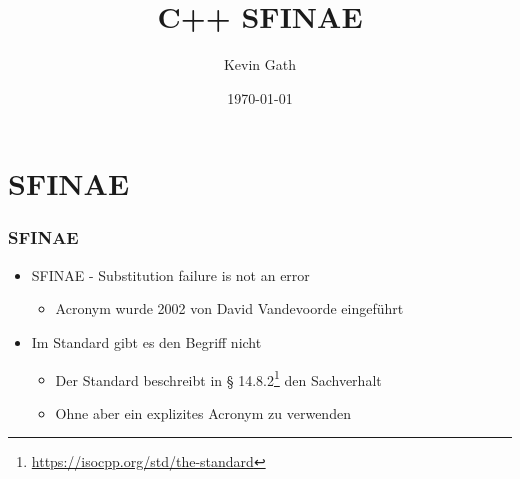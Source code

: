 \documentclass{beamer}
\title{C++ SFINAE}
\author{Kevin Gath}
\date{\today}
\begin{document}
\begin{frame}
\titlepage
\end{frame} 



\section{SFINAE} 
\begin{frame}
\frametitle{SFINAE} 
\begin{itemize}

\item SFINAE - \glqq{}Substitution failure is not an error\grqq
\begin{itemize}
\item Acronym wurde 2002 von David Vandevoorde eingeführt
\end{itemize}

\item Im Standard gibt es den Begriff nicht
\begin{itemize}
\item Der Standard beschreibt in § 14.8.2\footnote{\url{https://isocpp.org/std/the-standard}} den Sachverhalt
\item Ohne aber ein explizites Acronym zu verwenden
\end{itemize}

\end{itemize}

\end{frame}


\end{document}
